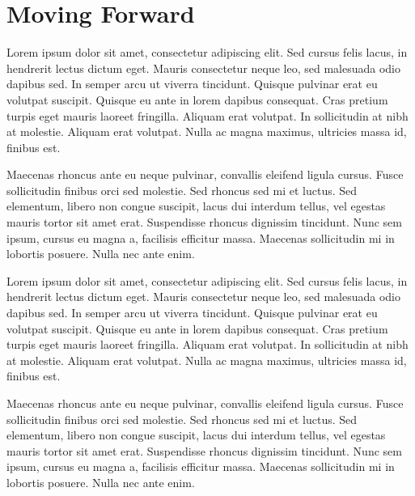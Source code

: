 \chapter{Moving Forward}

Lorem ipsum dolor sit amet, consectetur adipiscing elit. Sed cursus felis lacus, in hendrerit lectus dictum eget. Mauris consectetur neque leo, sed malesuada odio dapibus sed. In semper arcu ut viverra tincidunt. Quisque pulvinar erat eu volutpat suscipit. Quisque eu ante in lorem dapibus consequat. Cras pretium turpis eget mauris laoreet fringilla. Aliquam erat volutpat. In sollicitudin at nibh at molestie. Aliquam erat volutpat. Nulla ac magna maximus, ultricies massa id, finibus est.

Maecenas rhoncus ante eu neque pulvinar, convallis eleifend ligula cursus. Fusce sollicitudin finibus orci sed molestie. Sed rhoncus sed mi et luctus. Sed elementum, libero non congue suscipit, lacus dui interdum tellus, vel egestas mauris tortor sit amet erat. Suspendisse rhoncus dignissim tincidunt. Nunc sem ipsum, cursus eu magna a, facilisis efficitur massa. Maecenas sollicitudin mi in lobortis posuere. Nulla nec ante enim.

Lorem ipsum dolor sit amet, consectetur adipiscing elit. Sed cursus felis lacus, in hendrerit lectus dictum eget. Mauris consectetur neque leo, sed malesuada odio dapibus sed. In semper arcu ut viverra tincidunt. Quisque pulvinar erat eu volutpat suscipit. Quisque eu ante in lorem dapibus consequat. Cras pretium turpis eget mauris laoreet fringilla. Aliquam erat volutpat. In sollicitudin at nibh at molestie. Aliquam erat volutpat. Nulla ac magna maximus, ultricies massa id, finibus est.

Maecenas rhoncus ante eu neque pulvinar, convallis eleifend ligula cursus. Fusce sollicitudin finibus orci sed molestie. Sed rhoncus sed mi et luctus. Sed elementum, libero non congue suscipit, lacus dui interdum tellus, vel egestas mauris tortor sit amet erat. Suspendisse rhoncus dignissim tincidunt. Nunc sem ipsum, cursus eu magna a, facilisis efficitur massa. Maecenas sollicitudin mi in lobortis posuere. Nulla nec ante enim.

